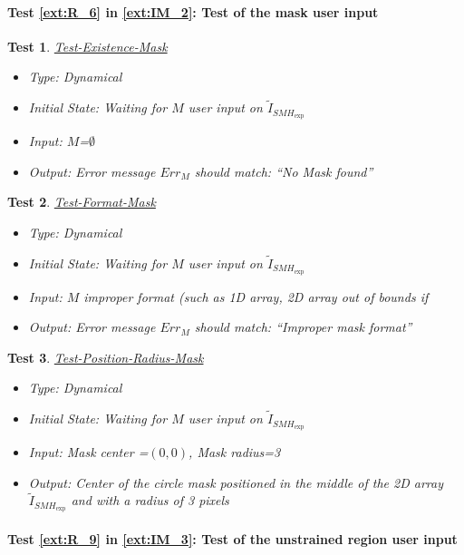 \documentclass[12pt, titlepage]{article}
\newtheorem{Test}{Test}
\begin{document}
\paragraph{Test \cref{ext:R_6} in \cref{ext:IM_2}: Test of the mask user input}

\begin{Test}\normalfont\underline{Test-Existence-Mask}
\label{Test-Existence-Mask}
\begin{itemize}
\item Type: Dynamical
\item Initial State: Waiting for $M$ user input on $\widetilde{I}_{\mathit{SMH}_{\text{exp}}}$
\item Input: $M$=$\emptyset$
\item Output:  Error message $Err_{M}$ should match: \enquote{No Mask found}
\end{itemize}
\end{Test}

\begin{Test}\normalfont\underline{Test-Format-Mask}
\label{Test-Format-Mask}
\begin{itemize}
\item Type: Dynamical
\item Initial State: Waiting for $M$ user input on $\widetilde{I}_{\mathit{SMH}_{\text{exp}}}$
\item Input: $M$ improper format (such as 1D array, 2D array out of bounds if  
\item Output:  Error message $Err_{M}$ should match: \enquote{Improper mask format}
\end{itemize}
\end{Test}

\begin{Test}\normalfont\underline{Test-Position-Radius-Mask}
\label{Test-Position-Radius-Mask}
\begin{itemize}
\item Type: Dynamical
\item Initial State: Waiting for $M$ user input on $\widetilde{I}_{\mathit{SMH}_{\text{exp}}}$
\item Input: Mask center =$(0,0)$, Mask radius=3
\item Output: Center of the circle mask positioned in the middle of the 2D array $\widetilde{I}_{\mathit{SMH}_{\text{exp}}}$ and with a radius of 3 pixels
\end{itemize}
\end{Test}

\paragraph{Test \cref{ext:R_9} in \cref{ext:IM_3}: Test of the unstrained region user input}
\end{document}
